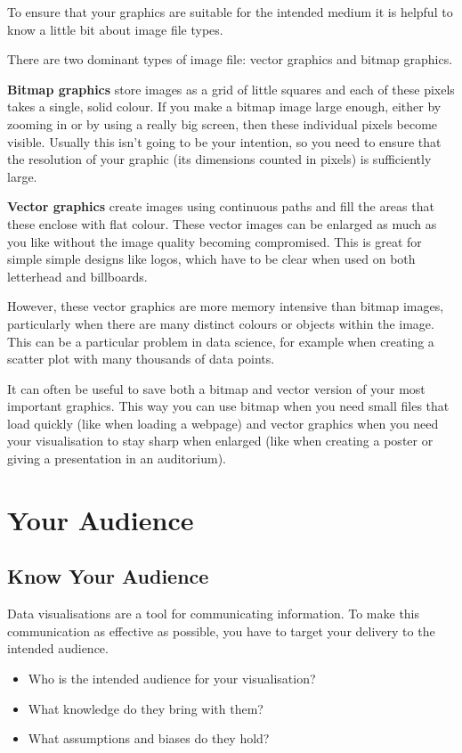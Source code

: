 \documentclass[
  letterpaper,
  DIV=11,
  numbers=noendperiod]{scrreprt}
\begin{document}
To ensure that your graphics are suitable for the intended medium it is
helpful to know a little bit about image file types.

There are two dominant types of image file: vector graphics and bitmap
graphics.

\textbf{Bitmap graphics} store images as a grid of little squares and
each of these pixels takes a single, solid colour. If you make a bitmap
image large enough, either by zooming in or by using a really big
screen, then these individual pixels become visible. Usually this isn't
going to be your intention, so you need to ensure that the resolution of
your graphic (its dimensions counted in pixels) is sufficiently large.

\textbf{Vector graphics} create images using continuous paths and fill
the areas that these enclose with flat colour. These vector images can
be enlarged as much as you like without the image quality becoming
compromised. This is great for simple simple designs like logos, which
have to be clear when used on both letterhead and billboards.

However, these vector graphics are more memory intensive than bitmap
images, particularly when there are many distinct colours or objects
within the image. This can be a particular problem in data science, for
example when creating a scatter plot with many thousands of data points.

It can often be useful to save both a bitmap and vector version of your
most important graphics. This way you can use bitmap when you need small
files that load quickly (like when loading a webpage) and vector
graphics when you need your visualisation to stay sharp when enlarged
(like when creating a poster or giving a presentation in an auditorium).

\section{Your Audience 👥}\label{your-audience}

\subsection{Know Your Audience}\label{know-your-audience}

Data visualisations are a tool for communicating information. To make
this communication as effective as possible, you have to target your
delivery to the intended audience.

\begin{itemize}
\item
  Who is the intended audience for your visualisation?
\item
  What knowledge do they bring with them?
\item
  What assumptions and biases do they hold?
\end{itemize}
\end{document}

